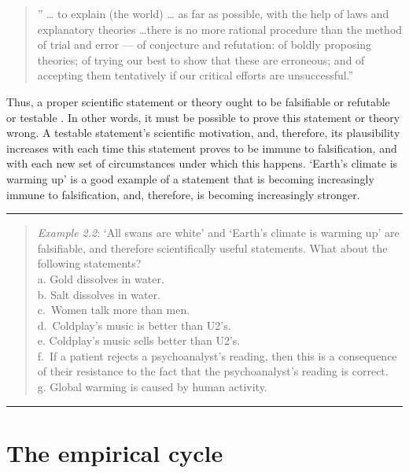 \documentclass[
]{book}
\begin{document}
\begin{quote}
'' \ldots{} to explain (the world) \ldots{} as far as possible, with the help of laws and explanatory theories \ldots there is no more rational procedure than the method of trial and error --- of conjecture and refutation: of boldly proposing theories; of trying our best to show that these are erroneous; and of accepting them tentatively if our critical efforts are unsuccessful.''
\end{quote}

Thus, a proper scientific statement or theory ought to be falsifiable or refutable or testable \citep{Popp63}. In other words, it must be possible to prove this statement or theory wrong. A testable statement's scientific motivation, and, therefore, its plausibility increases with each time this statement proves to be immune to falsification, and with each new set of circumstances under which this happens. `Earth's climate is warming up' is a good example of a statement that is becoming increasingly immune to falsification, and, therefore, is becoming increasingly stronger.

\begin{center}\rule{0.5\linewidth}{0.5pt}\end{center}

\begin{quote}
\emph{Example 2.2}: `All swans are white' and `Earth's climate is warming up' are falsifiable, and therefore scientifically useful statements. What about the following statements?\\
a. Gold dissolves in water.\\
b. Salt dissolves in water.\\
c.~Women talk more than men.\\
d.~Coldplay's music is better than U2's.\\
e. Coldplay's music sells better than U2's.\\
f.~If a patient rejects a psychoanalyst's reading, then this is a consequence of their resistance to the fact that the psychoanalyst's reading is correct.\\
g. Global warming is caused by human activity.
\end{quote}

\begin{center}\rule{0.5\linewidth}{0.5pt}\end{center}

\hypertarget{sec:empiricalcycle}{%
\section{The empirical cycle}\label{sec:empiricalcycle}}
\end{document}
